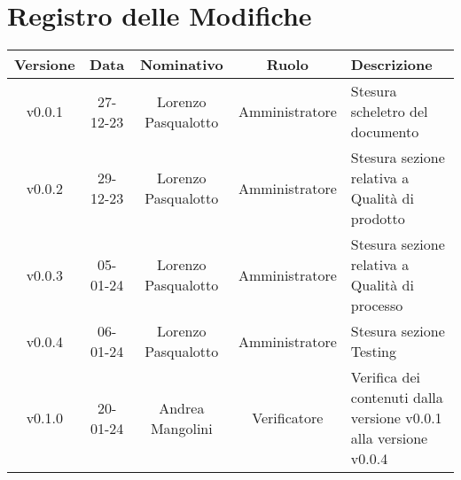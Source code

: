 \section*{\Large Registro delle Modifiche}
    \begin{table}[h]
        \centering
        \renewcommand\tabularxcolumn[1]{m{#1}} %
        \renewcommand{\arraystretch}{1.5}
        \begin{tabularx}{0.98\textwidth}
            {c|c|c|c|>{\centering\arraybackslash}X}
            \rowcolor{black}
            \textbf{\color{white} Versione} & \textbf{\color{white} Data} & \textbf{\color{white} Nominativo} & \textbf{\color{white} Ruolo} & \textbf{\color{white} Descrizione} \\ 
            \hline

            v0.0.1 & 27-12-23 & Lorenzo Pasqualotto & Amministratore & Stesura scheletro del documento \\

            v0.0.2 & 29-12-23 & Lorenzo Pasqualotto & Amministratore & Stesura sezione relativa a Qualità di prodotto\\

            v0.0.3 & 05-01-24 & Lorenzo Pasqualotto & Amministratore & Stesura sezione relativa a Qualità di processo\\

            v0.0.4 & 06-01-24 & Lorenzo Pasqualotto & Amministratore & Stesura sezione Testing\\

            v0.1.0 & 20-01-24 & Andrea Mangolini & Verificatore & Verifica dei contenuti dalla versione v0.0.1 alla versione v0.0.4\\

            \hline
        \end{tabularx}
    \end{table}